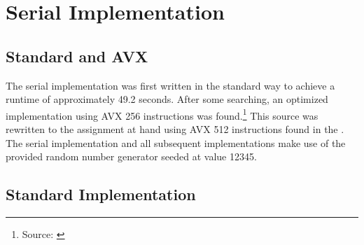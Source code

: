 \documentclass{article}
\newcommand{\MYhref}[3][blue]{\href{#2}{\color{#1}{#3}}}%
\begin{document}
\section{Serial Implementation}
\subsection{Standard and AVX}
The serial implementation was first written in the standard way to achieve a runtime of approximately 
49.2 seconds. After some searching, an optimized implementation using AVX 256 instructions was found.\footnote{Source: \MYhref{https://polarnick.com/blogs/other/cpu/gpu/sse/opencl/openmp/2016/10/01/mandelbrot-set-sse-opencl.html}{https://polarnick.com/blogs/other/cpu/gpu/sse/opencl/openmp/2016/10/01/mandelbrot-set-sse-opencl.html}} 
This source was rewritten to the assignment at hand using AVX 512 instructions found in the \MYhref{https://www.intel.com/content/www/us/en/docs/intrinsics-guide/index.html}{intel intrinsics guide}. 
The serial implementation and all subsequent implementations make use of the provided 
random number generator seeded at value 12345.

\subsection{Standard Implementation}
\end{document}

